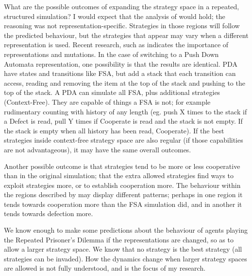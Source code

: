\documentclass[a4paper,11pt]{article}
\begin{document}
What are the possible outcomes of expanding the strategy space in a repeated, structured simulation? 
I would expect that the analysis of \citet{van-veelen:PNAS:2012} would hold; the reasoning was not representation-specific. 
Strategies in those regions will follow the predicted behaviour, but the strategies that appear may vary when a different representation is used. 
Recent research, such as \citet{garcia:PLoSOne:2012} indicates the importance of representations and mutations. 
In the case of switching to a Push Down Automata representation, one possibility is that the results are identical. 
PDA have states and transitions like FSA, but add a stack that each transition can access, reading and removing the item at the top of the stack and pushing to the top of the stack. 
A PDA can simulate all FSA, plus additional strategies (Context-Free)\citep{Sipser2006}.  
They are capable of things a FSA is not; for example rudimentary counting with history of any length (eg. push X times to the stack if a Defect is read, pull Y times if Cooperate is read and the stack is not empty. If the stack is empty when all history has been read, Cooperate). If the best strategies inside context-free strategy space are also regular (if those capabilities are not advantageous), it may have the same overall outcomes.  

Another possible outcome is that strategies tend to be more or less cooperative than in the original simulation; that the extra allowed strategies find ways to exploit strategies more, or to establish cooperation more. 
The behaviour within the regions described by \citet{van-veelen:PNAS:2012} may display different patterns; perhaps in one region it tends towards cooperation more than the FSA simulation did, and in another it tends towards defection more. 

We know enough to make some predictions about the behaviour of agents playing the Repeated Prisoner's Dilemma if the representations are changed, so as to allow a larger strategy space. 
We know that no strategy is the best strategy (all strategies can be invaded). 
How the dynamics change when larger strategy spaces are allowed is not fully understood, and is the focus of my research.



\end{document}
